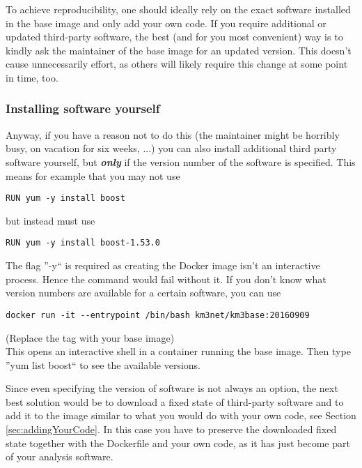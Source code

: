 \documentclass[a4paper, twoside, 11pt]{article}
\begin{document}
To achieve reproducibility, one should ideally rely on the exact software installed in the base image and only add your own code. 
If you require additional or updated third-party software, the best (and for you most convenient) way 
is to kindly ask the maintainer of the base image for an updated version. 
This doesn't cause unnecessarily effort, 
as others will likely require this change at some point in time, too. 

\subsubsection{Installing software yourself}
Anyway, if you have a reason not to do this (the maintainer might be horribly busy, on vacation for six weeks, ...) 
you can also install additional third party software yourself, 
but \textbf{\textit{only}} if the version number of the software is specified. 
This means for example that you may not use 
\begin{lstlisting}[basicstyle=\ttfamily\small,columns=flexible,keepspaces=true,frame=single]
RUN yum -y install boost 
\end{lstlisting}
but instead must use 
\begin{lstlisting}[basicstyle=\ttfamily\small,columns=flexible,keepspaces=true,frame=single]
RUN yum -y install boost-1.53.0
\end{lstlisting}
The flag ''-y`` is required as creating the Docker image isn't an interactive process. 
Hence the command would fail without it. 
If you don't know what version numbers are available for a certain software, you can use 
\begin{lstlisting}[basicstyle=\ttfamily\small,columns=flexible,keepspaces=true,frame=single]
docker run -it --entrypoint /bin/bash km3net/km3base:20160909
\end{lstlisting}
(Replace the tag with your base image) \\
This opens an interactive shell in a container running the base image. 
Then type ''yum list boost`` to see the available versions. 

Since even specifying the version of software is not always an option, 
the next best solution would be to download a fixed state of third-party software 
and to add it to the image similar to what you would do with your own code, 
see Section \ref{sec:addingYourCode}. 
In this case you have to preserve the downloaded fixed state together with the Dockerfile and your own code, 
as it has just become part of your analysis software. 
\end{document}

